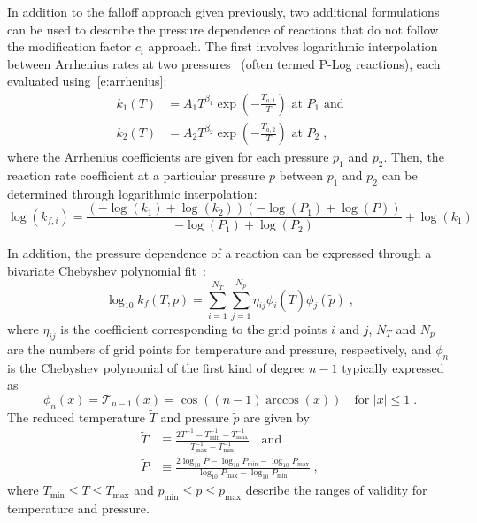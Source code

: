 \documentclass[12pt]{article}
\begin{document}
In addition to the falloff approach given previously, two additional formulations can be used to describe the pressure dependence of reactions that do not follow the modification factor $c_i$ approach.
The first involves logarithmic interpolation between Arrhenius rates at two pressures~\cite{chemkin:2012,Goodwin:2015aa} (often termed P-Log reactions), each evaluated using~\cref{e:arrhenius}:
\begin{align}
k_1 (T) &= A_1 T^{\beta_1} \exp \left( -\frac{T_{a, 1}}{T} \right) \text{ at } P_1 \text{ and} \label{e:plog_k1} \\
k_2 (T) &= A_2 T^{\beta_2} \exp \left( -\frac{T_{a, 2}}{T} \right) \text{ at } P_2 \;, \label{e:plog_k2}
\end{align}
where the Arrhenius coefficients are given for each pressure $p_1$ and $p_2$.
Then, the reaction rate coefficient at a particular pressure $p$ between $p_1$ and $p_2$ can be determined through logarithmic interpolation:
\begin{equation}
\label{e:kf_plog}
\log{\left ({k_{f, i}} \right )} = \frac{\left(- \log{\left (k_{1} \right )} + \log{\left (k_{2} \right )}\right) \left(- \log{\left (P_{1} \right )} + \log{\left (P \right )}\right)}{- \log{\left (P_{1} \right )} + \log{\left (P_{2} \right )}} + \log{\left (k_{1} \right )}
\end{equation}

In addition, the pressure dependence of a reaction can be expressed through a bivariate Chebyshev polynomial fit~\cite{Venkatesh:1997hv,Venkatesh:1997ik,Venkatesh:2000gj,chemkin:2012,Goodwin:2015aa}:
\begin{equation}
\label{e:kf_cheb}
\log_{10} k_f (T, p) = \sum_{i = 1}^{N_T} \sum_{j = 1}^{N_p} \eta_{ij} \phi_i (\tilde{T}) \phi_j \left(\tilde{p}\right) \;,
\end{equation}
where $\eta_{ij}$ is the coefficient corresponding to the grid points $i$ and $j$, $N_T$ and $N_p$ are the numbers of grid points for temperature and pressure, respectively, and $\phi_n$ is the Chebyshev polynomial of the first kind of degree $n - 1$ typically expressed as
\begin{equation}
\phi_n (x) = \mathcal{T}_{n-1} (x) = \cos \left( (n - 1) \arccos (x) \right) \quad \text{for } |x| \leq 1 \;.
\end{equation}
The reduced temperature $\tilde{T}$ and pressure $\tilde{p}$ are given by
\begin{align}
\tilde{T} &\equiv \frac{2 T^{-1} - T^{-1}_{\min} - T^{-1}_{\max}}{T^{-1}_{\max} - T^{-1}_{\min}} \quad\text{and} \\
\tilde{P} &\equiv \frac{2\log_{10} P - \log_{10} P_{\min} - \log_{10} P_{\max}}{\log_{10} P_{\max} - \log_{10} P_{\min}} \;,
\end{align}
where $T_{\min} \leq T \leq T_{\max}$ and $p_{\min} \leq p \leq p_{\max}$ describe the ranges of validity for temperature and pressure.
\end{document}
